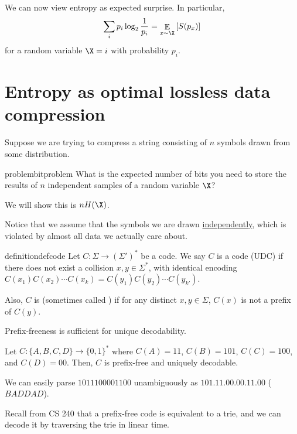 \documentclass[class=co432,notes,tikz]{agony}
\DeclareMathOperator*{\E}{\mathbb{E}}
\begin{document}
We can now view entropy as expected surprise. In particular,
\[ \sum_i p_i \log_2\frac{1}{p_i} = \E_{x \sim \X}\qty[S(p_x)] \]
for a random variable $\X = i$ with probability $p_i$.

\section{Entropy as optimal lossless data compression}

Suppose we are trying to compress a string consisting of $n$
symbols drawn from some distribution.

\begin{restatable}{problem}{bitproblem}
  What is the expected number of bits you need to store the results of $n$ independent samples
  of a random variable $\X$?
\end{restatable}

We will show this is $nH(\X)$.

Notice that we assume that the symbols we are drawn \uline{independently},
which is violated by almost all data we actually care about.

\begin{restatable}{definition}{defcode}
  Let $C : \Sigma \to (\Sigma')^*$ be a code.
  We say $C$ is a  code (UDC) if there does not exist
  a collision $x, y \in \Sigma^*$,
  with identical encoding $C(x_1)C(x_2)\cdots C(x_k) = C(y_1)C(y_2)\cdots C(y_{k'})$.

  Also, $C$ is  (sometimes called )
  if for any distinct $x,y \in \Sigma$, $C(x)$ is not a prefix of $C(y)$.
\end{restatable}

\begin{prop}
  Prefix-freeness is sufficient for unique decodability.
\end{prop}

\begin{example}
  Let $C : \{A,B,C,D\} \to \{0,1\}^*$ where
  $C(A) = 11$, $C(B) = 101$, $C(C) = 100$, and $C(D) = 00$.
  Then, $C$ is prefix-free and uniquely decodable.

  We can easily parse $1011100001100$ unambiguously as $101.11.00.00.11.00$
  ($BADDAD$).
\end{example}

Recall from CS 240 that a prefix-free code is equivalent to a trie,
and we can decode it by traversing the trie in linear time.
\end{document}
